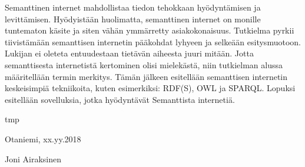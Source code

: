 \documentclass[finnish, 12pt, a4paper, elec, utf8, pdfa, online]{aaltothesis}
\date{24.4.2018}
\begin{document}
\makecoverpage

\makecopyrightpage

\begin{abstractpage}[finnish]
Semanttinen internet mahdollistaa tiedon tehokkaan hyödyntämisen ja levittämisen. Hyödyistään huolimatta, semanttinen internet on monille tuntematon käsite ja siten vähän ymmärretty asiakokonaisuus. Tutkielma pyrkii tiivistämään semanttisen internetin pääkohdat lyhyeen ja selkeään esitysmuotoon. Lukijan ei oleteta entuudestaan tietävän aiheesta juuri mitään. Jotta semanttisesta internetistä kertominen olisi mielekästä, niin tutkielman alussa määritellään termin merkitys. Tämän jälkeen esitellään semanttisen internetin keskeisimpiä tekniikoita, kuten esimerkiksi: RDF(S), OWL ja SPARQL. Lopuksi esitellään sovelluksia, jotka hyödyntävät Semanttista internetiä.
\end{abstractpage}


\newpage





tmp

\vspace{5cm}
Otaniemi, xx.yy.2018

\vspace{5mm}
{\hfill Joni Airaksinen \hspace{1cm}}

\newpage
\end{document}
